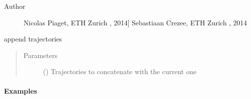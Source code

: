 \documentclass[a4paper,10pt,english]{sphinxmanual}
\begin{document}
\begin{fulllineitems}
\begin{sphinxVerbatim}[commandchars=\\\{\}]
  
  \PYG{p}{[}\PYG{p}{[}  \PYG{p}{]} \PYG{p}{]}
\end{sphinxVerbatim}
\begin{description}
\item[{Author}] \leavevmode{[}Nicolas Piaget, ETH Zurich , 2014{]}
Sebastiaan Crezee, ETH Zurich , 2014

\end{description}

\begin{fulllineitems}
\label{\detokenize{lagranto:lagranto.Tra.append}}
append trajectories
\begin{quote}\begin{description}
\item[{Parameters}] \leavevmode
{} () \textendash{} Trajectories to concatenate with the current one

\end{description}\end{quote}
\paragraph{Examples}

\begin{sphinxVerbatim}[commandchars=\\\{\}]
  
  \PYG{p}{[}    \PYG{p}{]}
\end{sphinxVerbatim}

\end{fulllineitems}


\end{fulllineitems}
\end{document}
